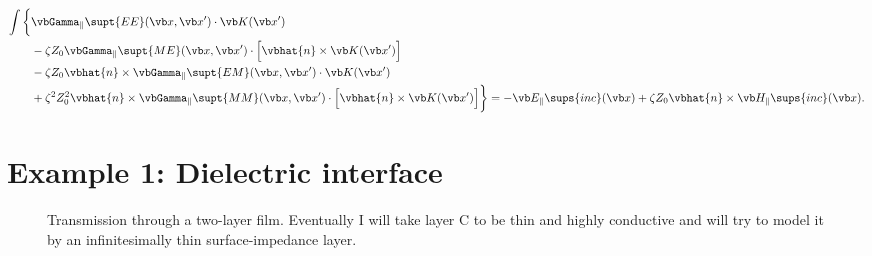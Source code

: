 \documentclass{article}
\newcommand{\BG}{\vbGamma}
\begin{document}
\begin{enumerate}
\begin{align*}
       \int\bigg\{ &\BG_{\parallel}\supt{EE}(\vb x, \vb x^\prime) 
                   \cdot \vb K(\vb x^\prime)
                   \\
                   &-\zeta Z_0\BG_{\parallel}\supt{ME}(\vb x, \vb x^\prime)
                   \cdot \Big[\vbhat{n}\times \vb K(\vb x^\prime)\Big] 
                   \\
                   &-\zeta Z_0\vbhat{n}\times \BG_{\parallel}\supt{EM}(\vb x, \vb x^\prime) 
                   \cdot \vb K(\vb x^\prime)
                   \\
                   &+\zeta^2 Z_0^2
                   \vbhat{n}\times\BG_{\parallel}\supt{MM}(\vb x, \vb x^\prime)
                   \cdot \Big[\vbhat{n}\times \vb K(\vb x^\prime)\Big]
       \bigg\}
       = -\vb E_{\parallel}\sups{inc}(\vb x) 
            +\zeta Z_0 \vbhat{n}\times \vb H_{\parallel}\sups{inc}(\vb x).
       \end{align*}
\end{enumerate}

\newpage
\section{Example 1: Dielectric interface}

\begin{figure}[h]
\caption{Transmission through a two-layer film. Eventually I will take
layer C to be thin and highly conductive and will try to model it 
by an infinitesimally thin surface-impedance layer.}
\end{figure}
\end{document}
